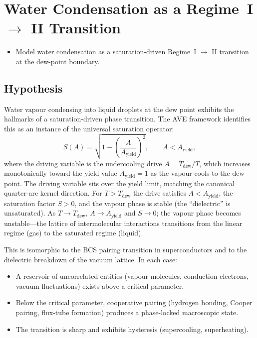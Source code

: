 \section{Water Condensation as a Regime~I $\to$ II Transition}
\label{sec:water_condensation}


\begin{objectivebox}
\begin{itemize}
    \item Model water condensation as a saturation-driven Regime~I $\to$ II transition at the dew-point boundary.
\end{itemize}
\end{objectivebox}

\subsection{Hypothesis}

Water vapour condensing into liquid droplets at the dew point
exhibits the hallmarks of a saturation-driven phase transition.
The AVE framework identifies this as an instance of the universal
saturation operator:
\begin{equation}
  S(A)
  = \sqrt{1 - \left(\frac{A}{A_{\mathrm{yield}}}\right)^2},
  \qquad A < A_{\mathrm{yield}},
\end{equation}
where the driving variable is the undercooling drive
$A = T_{\mathrm{dew}}/T$, which increases monotonically toward the
yield value $A_{\mathrm{yield}} = 1$ as the vapour cools to the dew
point.  The driving variable sits over the yield limit, matching
the canonical quarter-arc kernel direction.  For $T > T_{\mathrm{dew}}$
the drive satisfies $A < A_{\mathrm{yield}}$, the saturation factor
$S > 0$, and the vapour phase is stable (the ``dielectric'' is
unsaturated).  As $T \to T_{\mathrm{dew}}$, $A \to A_{\mathrm{yield}}$
and $S \to 0$; the vapour phase becomes unstable---the lattice of
intermolecular interactions transitions from the linear regime (gas)
to the saturated regime (liquid).

This is isomorphic to the BCS pairing transition in
superconductors and to the dielectric breakdown of the vacuum
lattice.  In each case:
\begin{itemize}
  \item A reservoir of uncorrelated entities (vapour molecules,
        conduction electrons, vacuum fluctuations) exists above
        a critical parameter.
  \item Below the critical parameter, cooperative pairing
        (hydrogen bonding, Cooper pairing, flux-tube formation)
        produces a phase-locked macroscopic state.
  \item The transition is sharp and exhibits hysteresis
        (supercooling, superheating).
\end{itemize}

